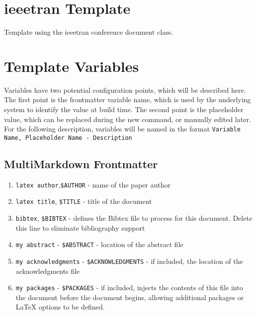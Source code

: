 \part{ieeetran Template}
\label{ieeetrantemplate}

Template using the ieeetran conference document class.

\part{Template Variables}
\label{templatevariables}

Variables have two potential configuration points, which will be described here. The first point is the frontmatter variable name, which is used by the underlying system to identify the value at build time. The second point is the placeholder value, which can be replaced during the new command, or manually edited later. For the following description, variables will be named in the format \texttt{Variable Name, Placeholder Name - Description}

\chapter{MultiMarkdown Frontmatter}
\label{multimarkdownfrontmatter}

\begin{enumerate}
\item \texttt{latex author},\texttt{\$AUTHOR} - name of the paper author

\item \texttt{latex title}, \texttt{\$TITLE} - title of the document

\item \texttt{bibtex}, \texttt{\$BIBTEX} - defines the Bibtex file to process for this document. Delete this line to eliminate bibliography support

\item \texttt{my abstract} - \texttt{\$ABSTRACT} - location of the abstract file

\item \texttt{my acknowledgments} - \texttt{\$ACKNOWLEDGMENTS} - if included, the location of the acknowledgments file

\item \texttt{my packages} - \texttt{\$PACKAGES} - if included, injects the contents of this file into the document before the document begins, allowing additional packages or LaTeX options to be defined.

\end{enumerate}

